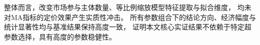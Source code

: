 整体而言，改变市场参与主体数量、等比例缩放模型特征提取与拟合维度，
均未对MA指标的定价效果产生实质性冲击。
所有参数组合下的结论方向、经济幅度与统计显著性均与基准结果保持高度一致，
证明本文核心实证结果不依赖于特定超参数选择，具有高度的参数稳健性。

 \FloatBarrier